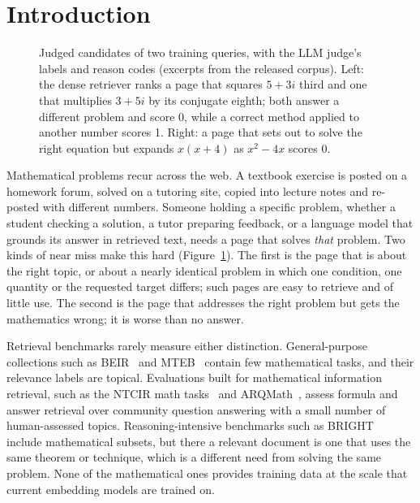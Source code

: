 \section{Introduction}
\label{sec:intro}

\begin{figure}[t]
\centering

\caption{Judged candidates of two training queries, with the LLM judge's labels and reason codes (excerpts from the released corpus). Left: the dense retriever ranks a page that squares $5+3i$ third and one that multiplies $3+5i$ by its conjugate eighth; both answer a different problem and score 0, while a correct method applied to another number scores 1. Right: a page that sets out to solve the right equation but expands $x(x+4)$ as $x^2-4x$ scores 0.}
\label{fig:example}
\end{figure}

Mathematical problems recur across the web. A textbook exercise is posted on a homework forum, solved on a tutoring site, copied into lecture notes and re-posted with different numbers. Someone holding a specific problem, whether a student checking a solution, a tutor preparing feedback, or a language model that grounds its answer in retrieved text, needs a page that solves \emph{that} problem. Two kinds of near miss make this hard (Figure~\ref{fig:example}). The first is the page that is about the right topic, or about a nearly identical problem in which one condition, one quantity or the requested target differs; such pages are easy to retrieve and of little use. The second is the page that addresses the right problem but gets the mathematics wrong; it is worse than no answer.

Retrieval benchmarks rarely measure either distinction. General-purpose collections such as BEIR~\citep{thakur2021beir} and MTEB~\citep{muennighoff2023mteb} contain few mathematical tasks, and their relevance labels are topical. Evaluations built for mathematical information retrieval, such as the NTCIR math tasks~\citep{zanibbi2016ntcir12} and ARQMath~\citep{zanibbi2020arqmath}, assess formula and answer retrieval over community question answering with a small number of human-assessed topics. Reasoning-intensive benchmarks such as BRIGHT~\citep{su2025bright} include mathematical subsets, but there a relevant document is one that uses the same theorem or technique, which is a different need from solving the same problem. None of the mathematical ones provides training data at the scale that current embedding models are trained on.


